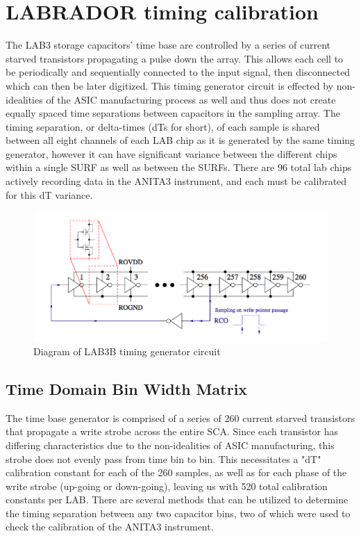 \section{LABRADOR timing calibration}
		The LAB3 storage capacitors' time base are controlled by a series of current starved transistors propagating a pulse down the array.  This allows each cell to be periodically and sequentially connected to the input signal, then disconnected  which can then be later digitized.  This timing generator circuit is effected by non-idealities of the ASIC manufacturing process as well and thus does not create equally spaced time separations between capacitors in the sampling array.  The timing separation, or delta-times (dTs for short), of each sample is shared between all eight channels of each LAB chip as it is generated by the same timing generator, however it can have significant variance between the different chips within a single SURF as well as between the SURFs.  There are 96 total lab chips actively recording data in the ANITA3 instrument, and each must be calibrated for this dT variance.

\noindent		
\begin{figure}
	\includegraphics[width=\textwidth]{figures/LAB3BTimingGenerator}
	\caption{Diagram of LAB3B timing generator circuit\cite{LABASICPAPER} }
	\label{fig:timingGenerator}
\end{figure}

	\subsection{Time Domain Bin Width Matrix}
		The time base generator is comprised of a series of 260 current starved transistors that propagate a write strobe across the entire SCA.  Since each transistor has differing characteristics due to the non-idealities of ASIC manufacturing, this strobe does not evenly pass from time bin to bin.  This necessitates a "dT" calibration constant for each of the 260 samples, as well as for each phase of the write strobe (up-going or down-going), leaving us with 520 total calibration constants per LAB.  There are several methods that can be utilized to determine the timing separation between any two capacitor bins, two of which were used to check the calibration of the ANITA3 instrument.
		
